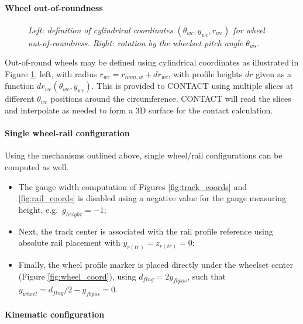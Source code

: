 \documentclass[12pt]{report}
\begin{document}
\paragraph{Wheel out-of-roundness}

\begin{figure}[bt]
\centering
{}
\hspace{10mm}
\caption{\em Left: definition of cylindrical coordinates $(\theta_{wc},
        y_{wc},r_{wc})$ for wheel out-of-roundness. Right: rotation by the
        wheelset pitch angle $\theta_{ws}$.}
\label{fig:wheel_theta}
\end{figure}

Out-of-round wheels may be defined using cylindrical coordinates as
illustrated in Figure \ref{fig:wheel_theta}, left, with radius
$r_{wc}=r_{nom,w}+dr_{wc}$, with profile heights $dr$ given as a function
$dr_{wc}(\theta_{wc},y_{wc})$. This is provided to
CONTACT using multiple slices at different $\theta_{wc}$ positions
around the circumference. CONTACT will read the slices and interpolate
as needed to form a 3D surface for the contact calculation.

\paragraph{Single wheel-rail configuration}

Using the mechanisms outlined above, single wheel/rail configurations can
be computed as well.
\begin{itemize}
\item The gauge width computation of Figures \ref{fig:track_coords} and
        \ref{fig:rail_coords} is disabled using a negative value for the
        gauge measuring height, e.g.\ $g_{height}=-1$;
\item Next, the track center is associated with the rail profile reference
        using absolute rail placement with $y_{r(tr)}=z_{r(tr)}=0$;
\item Finally, the wheel profile marker is placed directly under the
        wheelset center (Figure \ref{fig:wheel_coord}), using
        $d_{flng}=2 y_{fbpos}$, such that $y_{wheel}=d_{flng}/2-y_{fbpos}=0$.
\end{itemize}

\paragraph{Kinematic configuration}
\end{document}
